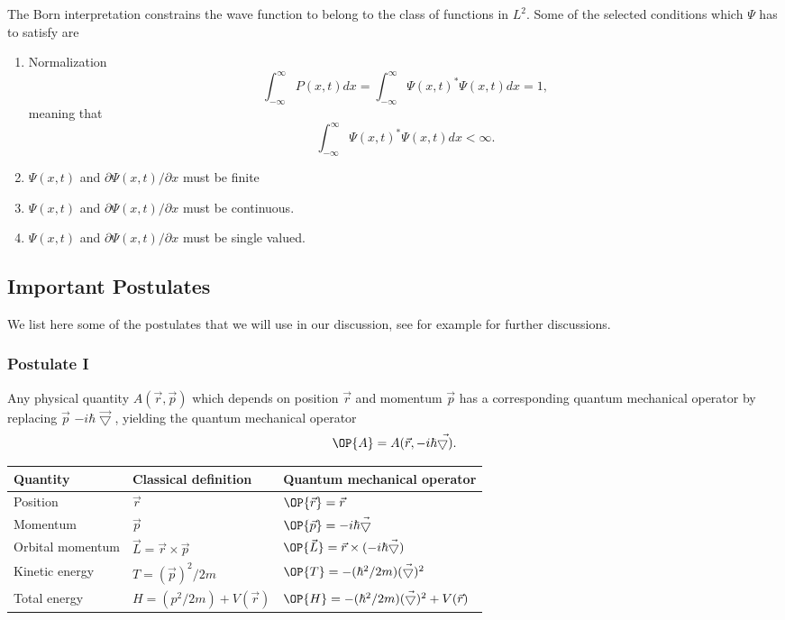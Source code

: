 The Born interpretation constrains the wave function to belong to the class of functions in $L^2$.  
Some of the selected conditions which $\Psi$ has to satisfy are
\begin{enumerate}
\item Normalization
\[
   \int_{-\infty}^{\infty}P(x,t)dx=\int_{-\infty}^{\infty}\Psi(x,t)^*\Psi(x,t)dx=1,
\]
meaning that
\[
  \int_{-\infty}^{\infty}\Psi(x,t)^*\Psi(x,t)dx < \infty.
\]
\item $\Psi(x,t)$ and $\partial \Psi(x,t)/\partial x$ must be finite
\item $\Psi(x,t)$ and $\partial \Psi(x,t)/\partial x$ must be continuous.
\item $\Psi(x,t)$ and $\partial \Psi(x,t)/\partial x$ must be single valued.
\end{enumerate}
\subsection{Important Postulates}
We list here some of the postulates that we will use in our discussion, see for example \cite{liboff}
for further discussions.
\subsubsection{Postulate I}
Any physical quantity $A(\vec{r},\vec{p})$ which depends on position
$\vec{r}$ and momentum
$\vec{p}$ has a corresponding quantum mechanical operator by replacing
$\vec{p}$  
$-i\hbar \vec{\bigtriangledown}$, yielding the quantum mechanical operator
%
\[
\OP{A} = A(\vec{r},-i\hbar \vec{\bigtriangledown)}.
\]
\begin{tabular}{|l|l|l|}  \hline
Quantity & Classical definition & Quantum mechanical operator\\
\hline
Position            & $\vec{r}$           & $\OP{\vec{r}} = \vec{r}$\\
Momentum    & $\vec{p}$
						  & $\OP{\vec{p}} = -i \hbar \vec{\bigtriangledown}$\\
Orbital momentum           & $\vec{L} = \vec{r} \times \vec{p}$
		  & $\OP{\vec{L}} = \vec{r} \times (-i\hbar \vec{\bigtriangledown})$\\
Kinetic energy     & $T = (\vec{p})^2 / 2 m$
						  & $\OP{T} = - (\hbar^2 / 2 m) (\vec{\bigtriangledown})^2$\\
Total energy 		  & $H = (p^2 / 2 m) + V(\vec{r})$
						  & $\OP{H} = - ( \hbar^2 / 2 m )(\vec{\bigtriangledown})^2
										  + V(\vec{r})$\\
\hline
\end{tabular}
